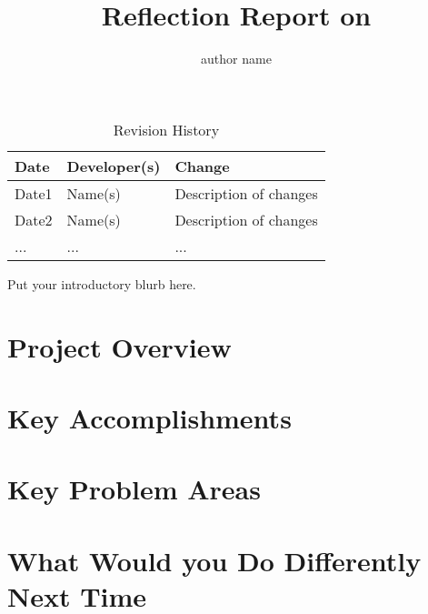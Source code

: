 \documentclass{article}
\title{Reflection Report on \progname}
\author{author name}
\date{}
\begin{document}
\begin{table}[hp]
\caption{Revision History} \label{TblRevisionHistory}
\begin{tabularx}{\textwidth}{llX}
\toprule
\textbf{Date} & \textbf{Developer(s)} & \textbf{Change}\\
\midrule
Date1 & Name(s) & Description of changes\\
Date2 & Name(s) & Description of changes\\
... & ... & ...\\
\bottomrule
\end{tabularx}
\end{table}

\newpage

\maketitle

Put your introductory blurb here.

\section{Project Overview}


\section{Key Accomplishments}


\section{Key Problem Areas}


\section{What Would you Do Differently Next Time}
\end{document}
